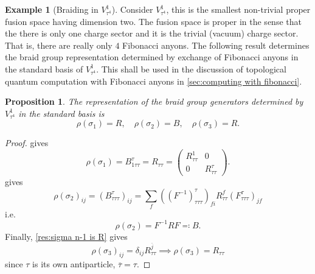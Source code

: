 \documentclass[a4paper,10pt,oneside]{book}
\theoremstyle{plain}
\newtheorem{proposition}[theorem]{Proposition}
\theoremstyle{definition}
\newtheorem{example}{Example}[section]
\theoremstyle{remark}
\begin{document}
\begin{example}[Braiding in $V_{τ^4}^1$]
  Consider $V_{τ^4}^1$, this is the smallest non-trivial proper fusion space having dimension two. The fusion space is proper in the sense that the there is only one charge sector and it is the trivial (vacuum) charge sector. That is, there are really only $4$ Fibonacci anyons. The following result determines the braid group representation determined by exchange of Fibonacci anyons in the standard basis of $V_{τ^4}^1$. This shall be used in the discussion of topological quantum computation with Fibonacci anyons in \cref{sec:computing with fibonacci}.

  \begin{proposition}\label{res:fibonacci qubit braiding}
    The representation of the braid group generators determined by $V_{τ^4}^1$ in the standard basis is
    \begin{equation}
      ρ(σ_1) = R,\quad
      ρ(σ_2) = B,\quad
      ρ(σ_3) = R.
    \end{equation}
  \end{proposition}

  \begin{proof}
     gives
    \begin{equation}
      ρ(σ_1) = B_{1ττ}^{τ} = R_{ττ} =
      \begin{pmatrix}
        R_{ττ}^1 & 0 \\
        0 & R_{ττ}^τ
      \end{pmatrix}.
    \end{equation}
     gives
    \begin{equation}
      ρ(σ_2)_{ij} = \left( B^τ_{τττ} \right)_{ij} = \sum_f \left( \left(F^{-1}\right)_{τττ}^τ \right)_{fi} R_{ττ}^f \left( F_{τττ}^τ \right)_{jf}
    \end{equation}
    i.e.
    \begin{equation}
      ρ(σ_2) = F^{-1} R F \eqqcolon B.
    \end{equation}
    Finally, \cref{res:sigma n-1 is R} gives
    \begin{equation}
      ρ(σ_3)_{ij} = \delta_{ij} R_{ττ}^{\overline{j}}
      \implies
      ρ(σ_3) = R_{ττ}
    \end{equation}
    since $τ$ is its own antiparticle, $\overline{τ} = τ$.
  \end{proof}
\end{example}
\end{document}
